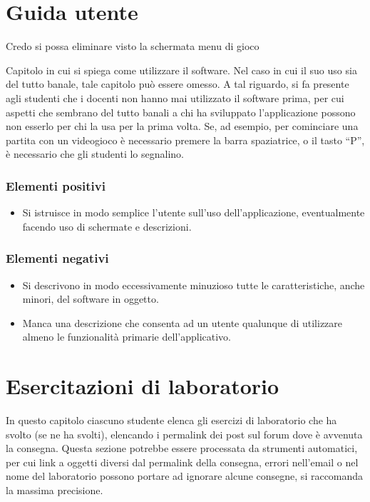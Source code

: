 \documentclass[a4paper,12pt]{report}
\begin{document}
\appendix
\chapter{Guida utente}

{\color{red}Credo si possa eliminare visto la schermata menu di gioco}

Capitolo in cui si spiega come utilizzare il software. Nel caso in cui il suo uso sia del tutto
banale, tale capitolo può essere omesso.
%
A tal riguardo, si fa presente agli studenti che i docenti non hanno mai utilizzato il software
prima, per cui aspetti che sembrano del tutto banali a chi ha sviluppato l'applicazione possono non
esserlo per chi la usa per la prima volta.
%
Se, ad esempio, per cominciare una partita con un videogioco è necessario premere la barra
spaziatrice, o il tasto ``P'', è necessario che gli studenti lo segnalino.

\subsection*{Elementi positivi}

\begin{itemize}
	\item Si istruisce in modo semplice l'utente sull'uso dell'applicazione, eventualmente facendo uso di schermate e descrizioni.
\end{itemize}

\subsection*{Elementi negativi}
\begin{itemize}
	\item Si descrivono in modo eccessivamente minuzioso tutte le caratteristiche, anche minori, del software in oggetto.
	\item Manca una descrizione che consenta ad un utente qualunque di utilizzare almeno le funzionalità primarie dell'applicativo.
\end{itemize}

\chapter{Esercitazioni di laboratorio}

In questo capitolo ciascuno studente elenca gli esercizi di laboratorio che ha svolto
(se ne ha svolti),
elencando i permalink dei post sul forum dove è avvenuta la consegna.
%
Questa sezione potrebbe essere processata da strumenti automatici,
per cui link a oggetti diversi dal permalink della consegna,
errori nell'email o nel nome del laboratorio possono portare ad ignorare alcune consegne,
si raccomanda la massima precisione.
\end{document}
